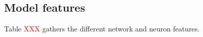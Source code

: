%
%

\subsection{Model features}
Table \textcolor{red}{XXX} gathers the different network and neuron features. 


